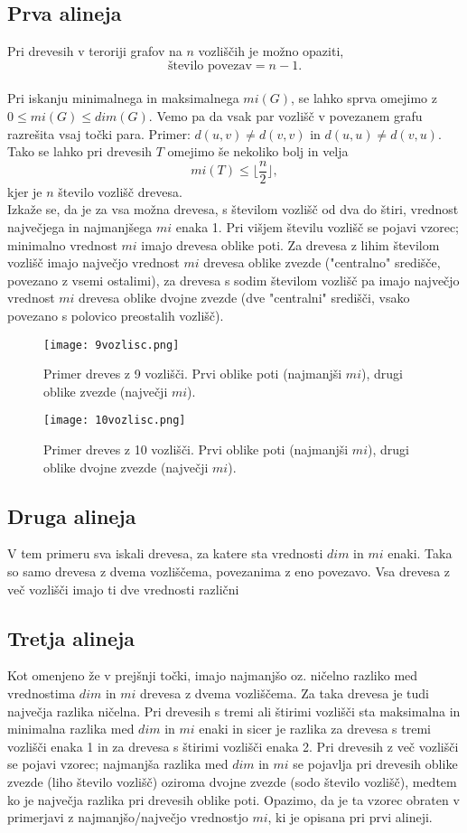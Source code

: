 \documentclass[a4paper]{article}
\begin{document}
\subsection{Prva alineja}
Pri drevesih v teroriji grafov na $n$ vozliščih je možno opaziti, $$\text{število povezav}  = n-1. $$ \\
Pri iskanju minimalnega in maksimalnega $mi(G)$, se lahko sprva omejimo z $0 \leq mi(G) \leq dim(G)$. Vemo pa da vsak par vozlišč v povezanem grafu razrešita vsaj točki para. Primer: $d(u,v) \neq d(v,v)$ in $d(u,u) \neq d(v,u)$. Tako se lahko pri drevesih $T$ omejimo še nekoliko bolj in velja $$mi(T) \leq \lfloor \frac{n}{2} \rfloor, $$ kjer je $n$ število vozlišč drevesa. \\
Izkaže se, da je za vsa možna drevesa, s številom vozlišč od dva do štiri, vrednost največjega in najmanjšega $mi$ enaka 1. Pri višjem številu vozlišč se pojavi vzorec; minimalno vrednost $mi$ imajo drevesa oblike poti. Za drevesa z lihim številom vozlišč imajo največjo vrednost $mi$ drevesa oblike zvezde ("centralno" središče, povezano z vsemi ostalimi), za drevesa s sodim številom vozlišč pa imajo največjo vrednost $mi$ drevesa oblike dvojne zvezde (dve "centralni" središči, vsako povezano s polovico preostalih vozlišč).
\begin{figure}[h!]
    \centering
    \texttt{[image: 9vozlisc.png]}
    \caption{Primer dreves z 9 vozlišči. Prvi oblike poti (najmanjši $mi$), drugi oblike zvezde (največji $mi$).}
    \label{fig:enter-label}
\end{figure}
\begin{figure}[h!]
    \centering
    \texttt{[image: 10vozlisc.png]}
    \caption{Primer dreves z 10 vozlišči. Prvi oblike poti (najmanjši $mi$), drugi oblike dvojne zvezde (največji $mi$).}
    \label{fig:enter-label}
\end{figure}

\subsection{Druga alineja}
V tem primeru sva iskali drevesa, za katere sta vrednosti $dim$ in $mi$ enaki. Taka so samo drevesa z dvema vozliščema, povezanima z eno povezavo. Vsa drevesa z več vozlišči imajo ti dve vrednosti različni
\subsection{Tretja alineja}
Kot omenjeno že v prejšnji točki, imajo najmanjšo oz. ničelno razliko med vrednostima $dim$ in $mi$ drevesa z dvema vozliščema. Za taka drevesa je tudi največja razlika ničelna. Pri drevesih s  tremi ali štirimi vozlišči sta maksimalna in minimalna razlika med $dim$ in $mi$ enaki in sicer je razlika za drevesa s tremi vozlišči enaka 1 in za drevesa s štirimi vozlišči enaka 2. Pri drevesih z več vozlišči se pojavi vzorec; najmanjša razlika med $dim$ in $mi$ se pojavlja pri drevesih oblike zvezde (liho število vozlišč) oziroma dvojne zvezde (sodo število vozlišč), medtem ko je največja razlika pri drevesih oblike poti. Opazimo, da je ta vzorec obraten v primerjavi z najmanjšo/največjo vrednostjo $mi$, ki je opisana pri prvi alineji.
\end{document}
